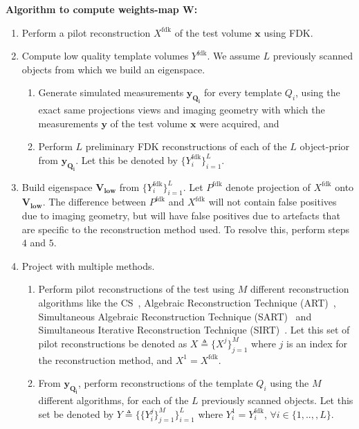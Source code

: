 \documentclass[journal]{IEEEtran}
\begin{document}
\textbf{Algorithm to compute weights-map $\boldsymbol{W}$:}
\label{sec:thealgo}
\begin{enumerate}

\item Perform a pilot reconstruction $X^{\text{fdk}}$ of the
  test volume $\boldsymbol{x}$ using FDK.

\item Compute low quality template volumes $Y^\text{fdk}$. 
We assume $L$ previously scanned objects from which we build
an eigenspace. 
\vspace{-0.1cm}

\begin{enumerate}
  \item Generate simulated measurements $\boldsymbol{y_{Q_i}}$ for
    every template $Q_i$, using the exact same projections views and
    imaging geometry with which the measurements $\boldsymbol{y}$ of
    the test volume $\boldsymbol{x}$ were acquired, and
\item Perform $L$ preliminary FDK reconstructions of each of the $L$
  object-prior from $\boldsymbol{y_{Q_i}}$.  Let this be denoted by
  $\{Y^{\text{fdk}}_i\}_{i=1}^L$.
  \end{enumerate}
\item Build eigenspace $\boldsymbol{V_{\text{low}}}$ from
  $\{Y^{\text{fdk}}_i\}_{i=1}^L$.  Let $P^{\text{fdk}}$ denote
  projection of $X^{\text{fdk}}$ onto
  $\boldsymbol{V_{\text{low}}}$. The difference between
  $P^{\text{fdk}}$ and $X^{\text{fdk}}$ will not contain false
  positives due to imaging geometry, but will have false positives due
  to artefacts that are specific to the reconstruction method used. To
  resolve this, perform steps $4$ and $5$.
\item Project with multiple methods.
  \begin{enumerate}
  \item Perform pilot reconstructions of the test using $M$ different
    reconstruction algorithms like the CS~\cite{lasso}, Algebraic Reconstruction Technique (ART)~\cite{art},
     Simultaneous Algebraic Reconstruction Technique (SART)~\cite{sart} and  Simultaneous Iterative Reconstruction Technique (SIRT)~\cite{sirt}. Let this set of pilot reconstructions be denoted
    as $X \triangleq \{X^j\}_{j=1}^M$ where $j$ is an index for the
    reconstruction method, and $X^1 = X^{\text{fdk}}$. 

  \item From $\boldsymbol{y_{Q_i}}$, perform reconstructions of the template $Q_i$ using the $M$ different algorithms, for each of the $L$ previously scanned objects. Let this set be denoted by $Y \triangleq \{\{Y_{i}^j\}_{j=1}^M\}_{i=1}^L$ where $Y^{1}_i = Y^{\text{fdk}}_i$, $\forall i \in \{1,..,,L\}$.



\end{enumerate}
\end{enumerate}
\end{document}
